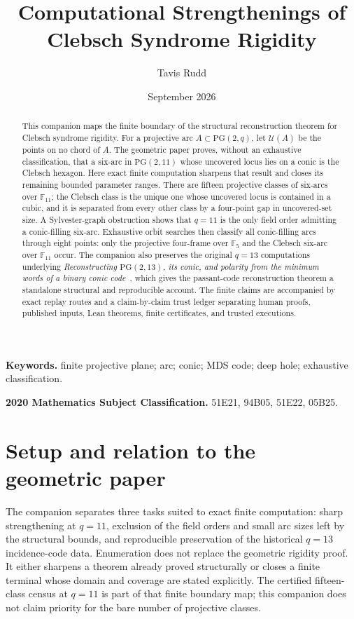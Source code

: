 \documentclass[11pt]{article}
\title{Computational Strengthenings of Clebsch Syndrome Rigidity}
\author{Tavis Rudd}
\date{September 2026}
\theoremstyle{remark}
\newcommand{\PG}{\mathrm{PG}}
\newcommand{\F}{\mathbb{F}}
\newcommand{\cU}{\mathcal{U}}
\begin{document}
\maketitle

\begin{abstract}
This companion maps the finite boundary of the structural reconstruction
theorem for Clebsch syndrome rigidity.  For a projective arc
$A\subset\PG(2,q)$, let $\cU(A)$ be the points on no chord of $A$.  The
geometric paper proves, without an exhaustive classification, that a six-arc
in $\PG(2,11)$ whose uncovered locus lies on a conic is the Clebsch hexagon.
Here exact finite computation sharpens that result and closes its remaining
bounded parameter ranges.
There are fifteen projective classes of six-arcs over $\F_{11}$; the
Clebsch class is the unique one whose uncovered locus is contained in a
cubic, and it is separated from every other class by a four-point gap in
uncovered-set size.  A Sylvester-graph obstruction shows that $q=11$ is the
only field order admitting a conic-filling six-arc.  Exhaustive orbit
searches then classify all conic-filling arcs through eight points: only
the projective four-frame over $\F_5$ and the Clebsch six-arc over
$\F_{11}$ occur.
The companion also preserves the original $q=13$ computations underlying
\emph{Reconstructing $\PG(2,13)$, its conic, and polarity from the minimum
words of a binary conic code}~\cite{RuddPassant2026}, which gives the
passant-code reconstruction theorem a standalone structural and reproducible
account.
The finite claims are accompanied by exact replay routes and a
claim-by-claim trust ledger separating human proofs, published inputs, Lean
theorems, finite certificates, and trusted executions.
\end{abstract}

\noindent\textbf{Keywords.} finite projective plane; arc; conic; MDS code;
deep hole; exhaustive classification.

\smallskip
\noindent\textbf{2020 Mathematics Subject Classification.} 51E21, 94B05,
51E22, 05B25.

\section{Setup and relation to the geometric paper}

The companion separates three tasks suited to exact finite computation:
sharp strengthening at $q=11$, exclusion of the field orders and small arc
sizes left by the structural bounds, and reproducible preservation of the
historical $q=13$ incidence-code data.  Enumeration does not replace the
geometric rigidity proof.  It either sharpens a theorem already proved
structurally or closes a finite terminal whose domain and coverage are stated
explicitly.
The certified fifteen-class census at \(q=11\) is part of that finite
boundary map; this companion does not claim priority for the bare number of
projective classes.
\end{document}
